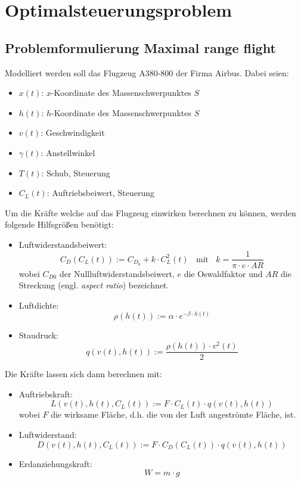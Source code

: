 \chapter{Optimalsteuerungsproblem}

\section{Problemformulierung \glqq Maximal range flight\grqq{}}
Modelliert werden soll das Flugzeug A380-800 der Firma Airbus. Dabei seien:
\begin{itemize}
    \item $x(t)$: $x$-Koordinate des Massenschwerpunktes $S$
    \item $h(t)$: $h$-Koordinate des Massenschwerpunktes $S$
    \item $v(t)$: Geschwindigkeit
    \item $\gamma(t)$: Anstellwinkel
    \item $T(t)$: Schub, Steuerung
    \item $C_L(t)$: Auftriebsbeiwert, Steuerung
\end{itemize}
Um die Kräfte welche auf das Flugzeug einwirken berechnen zu können, werden folgende Hilfsgrößen benötigt:
\begin{itemize}
    \item Luftwiderstandsbeiwert: \[C_D(C_L(t)) := C_{D_0} + k \cdot C^2_L(t) \ \ \ \ \text{mit} \ \ \ \ k = \dfrac{1}{\pi \cdot e \cdot AR}\] wobei $C_{D0}$ der Nullluftwiderstandsbeiwert, $e$ die Oswaldfaktor und $AR$ die Streckung (engl. \textit{aspect ratio}) bezeichnet.
    \item Luftdichte: \[\rho(h(t)) := \alpha \cdot e^{-\beta \cdot h(t)}\] %
    \item Staudruck: \[q(v(t), h(t)) := \dfrac{\rho(h(t)) \cdot v^2(t)}{2} \]
\end{itemize}
Die Kräfte lassen sich dann berechnen mit:
\begin{itemize}
    \item Auftriebskraft: \[L(v(t), h(t), C_L(t)) := F \cdot C_L(t) \cdot q(v(t), h(t))\] wobei $F$ die wirksame Fläche, d.h. die von der Luft angeströmte Fläche, ist.
    \item Luftwiderstand: \[D(v(t), h(t), C_L(t)) := F \cdot C_D(C_L(t)) \cdot q(v(t), h(t))\]
    \item Erdanziehungskraft: \[W = m \cdot g\]
\end{itemize}

